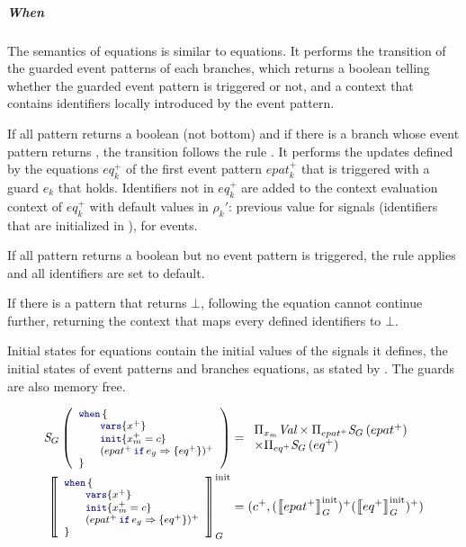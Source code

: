 \subparagraph{When}

The semantics of  equations is similar to  equations. It performs the
transition of the guarded event patterns of each branches, which returns a boolean telling whether
the guarded event pattern is triggered or not, and a context that contains identifiers locally
introduced by the event pattern.

If all pattern returns a boolean (not bottom) and if there is a branch whose event pattern returns
\true, the transition follows the rule . It
performs the updates defined by the equations $eq_k^+$ of the first event pattern $epat_k^+$ that is
triggered with a guard $e_k$ that holds.
%
Identifiers not in $eq^+_k$ are added to the context evaluation context of $eq_k^+$ with default
values in $\rho_k'$: previous value for signals (identifiers that are initialized in
), \none for events.

If all pattern returns a boolean but no event pattern is triggered, the rule
 applies and all identifiers are set to
default.

If there is a pattern that returns $\bot$, following
 the  equation cannot continue
further, returning the context  that maps every defined identifiers to $\bot$.

Initial states for  equations contain the initial values of the signals it defines, the
initial states of event patterns and branches equations, as stated by
. The guards are also memory free.

\begin{align}
    \stateTy{\mathfoot{\whenTab{x^+}{x_m^+ = c}{(\branch{epat^+}{e_g}{eq^+})^+}}}  & =
    \begin{array}{l}
        \Pi_{x_m} \Val \times \Pi_{epat^+} \stateTy{epat^+} \\
        \times \Pi_{eq^+} \stateTy{eq^+}
    \end{array}
    \label{eq:semantics:grsync:opsem:stateTy:eq:when}                                  \\
    \initsync{\mathfoot{\whenTab{x^+}{x_m^+ = c}{(\branch{epat^+}{e_g}{eq^+})^+}}} & =
    (c^+, (\initsync{epat^+})^+ (\initsync{eq^+})^+)
    \label{eq:semantics:grsync:opsem:init:eq:when}
\end{align}

